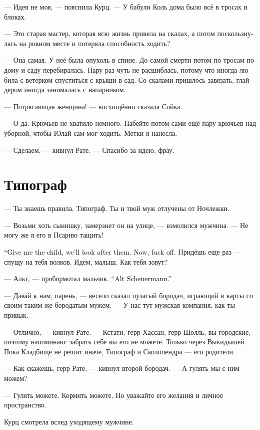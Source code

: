 \documentclass[a4paper,12pt,fleqn]{book}\usepackage{cooltooltips}\usepackage{polyglossia}\setdefaultlanguage[babelshorthands=true]{russian}\setotherlanguage{english}\defaultfontfeatures{Ligatures=TeX,Mapping=tex-text} \usepackage{xcolor}\definecolor{lightgray}{HTML}{bbbbbb}\color{lightgray}\newcommand{\ml}[3]{\textenglish{\textcolor{black}{#3}}}
\begin{document}
--- Идея не моя, --- пояснила Курц.
--- У бабули Коль дома было всё в тросах и блоках.

--- Это старая мастер, которая всю жизнь провела на скалах, а потом поскользнулась на ровном месте и потеряла способность ходить?

--- Она самая.
У неё была опухоль в спине.
До самой смерти потом по тросам по дому и саду перебиралась.
Пару раз чуть не расшиблась, потому что иногда любила с ветерком спуститься с крыши в сад.
Со скалами пришлось завязать, глайдером иногда занималась с напарником.

--- Потрясающая женщина! --- восхищённо сказала Сойка.

--- О да.
Крючьев не хватило немного.
Набейте потом сами ещё пару крючьев над уборной, чтобы Юлай сам мог ходить.
Метки я нанесла.

--- Сделаем, --- кивнул Рате.
--- Спасибо за идею, фрау.

\section{Типограф}

--- Ты знаешь правила, Типограф.
Ты и твой муж отлучены от Ночлежки.

--- Возьми хоть сынишку, замерзнет он на улице, --- взмолился мужчина.
--- Не могу же я его в Псарню тащить!

\ml{$0$}
{--- Ребёнка давай сюда, мы позаботимся.}
{``Give me the child, we'll look after them.}
\ml{$0$}
{А теперь вали отсюда.}
{Now, fuck off.}
Придёшь еще раз --- спущу на тебя волков.
Идём, малыш.
Как тебя зовут?

--- Альт, --- пробормотал мальчик.
\ml{$0$}
{--- Альт Шоэрманн.}
{``Alt Scheuermann.''}

--- Давай к нам, парень, --- весело сказал пузатый бородач, играющий в карты со своим таким же бородатым мужем.
--- У нас тут мужская компания, как ты привык.

--- Отлично, --- кивнул Рате.
--- Кстати, герр Хассан, герр Шолль, вы городские, поэтому напоминаю: забрать себе вы его не можете.
Только через Выкидышей.
Пока Кладбище не решит иначе, Типограф и Сколопендра --- его родители.

--- Как скажешь, герр Рате, --- кивнул второй бородач.
--- А гулять мы с ним можем?

--- Гулять можете.
Кормить можете.
Но уважайте его желания и личное пространство.

Курц смотрела вслед уходящему мужчине.
\end{document}
